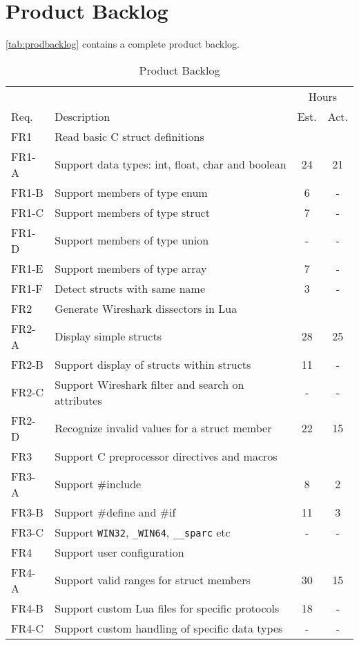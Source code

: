 \section{Product Backlog}
\label{sec:prodbacklog}
\autoref{tab:prodbacklog} contains a complete product backlog.

\begin{table}[ht] \small \center
\caption{Product Backlog \label{tab:prodbacklog}}
\begin{tabularx}{\textwidth}{l X c c}
	\toprule
	& & \multicolumn{2}{c}{Hours} \\
	\cmidrule(r){3-4}
	Req. & Description & Est. & Act. \\
	\midrule
	FR1 & Read basic C struct definitions & & \\
	FR1-A & Support data types: int, float, char and boolean & 24 & 21 \\
	FR1-B & Support members of type enum & 6 & - \\
	FR1-C & Support members of type struct & 7 & - \\
	FR1-D & Support members of type union & - & - \\
	FR1-E & Support members of type array & 7 & - \\
	FR1-F & Detect structs with same name & 3 & - \\
	\addlinespace
	FR2 & Generate Wireshark dissectors in Lua & & \\
	FR2-A & Display simple structs & 28 & 25 \\
	FR2-B & Support display of structs within structs & 11 & - \\
	FR2-C & Support Wireshark filter and search on attributes & - & - \\
	FR2-D & Recognize invalid values for a struct member & 22 & 15 \\
	\addlinespace
	FR3 & Support C preprocessor directives and macros & & \\
	FR3-A & Support \#include & 8 & 2 \\
	FR3-B & Support \#define and \#if & 11 & 3 \\
	FR3-C & Support \verb+WIN32+, \verb+_WIN64+, \verb+__sparc+ etc & - & - \\
	\addlinespace
	FR4 & Support user configuration & & \\
	FR4-A & Support valid ranges for struct members & 30 & 15 \\
	FR4-B & Support custom Lua files for specific protocols & 18 & - \\
	FR4-C & Support custom handling of specific data types & - & - \\

\end{tabularx}
\end{table}
